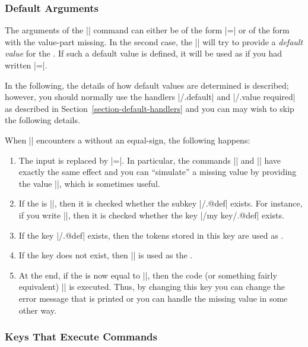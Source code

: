 \subsubsection{Default Arguments}

The arguments of the |\pgfkeys| command can either be of the form
|=| or of the form  with the
value-part missing. In the second case, the |\pgfkeys| will try to
provide a \emph{default value} for the . If such a default
value is defined, it will be used as if you had written
|=|.

In the following, the details of how default values are determined is
described; however, you should normally use the handlers |/.default|
and |/.value required| as described in
Section~\ref{section-default-handlers} and you can may wish to skip
the following details.

When |\pgfkeys| encounters a  without an equal-sign, the
following happens:
\begin{enumerate}
\item The input is replaced by |=\pgfkeysnovalue|. In
  particular, the commands || and
  || have exactly the same effect and
  you can ``simulate'' a missing value by providing the value
  |\pgfkeysnovalue|, which is sometimes useful. 
\item If the  is |\pgfkeysnovalue|, then it is checked
  whether the subkey |/.@def| exists. For instance, if you
  write ||, then it is checked whether the key
  |/my key/.@def| exists.
\item If the key |/.@def| exists, then the tokens stored in
  this key are used as .
\item If the key does not exist, then |\pgfkeysnovalue| is used as the
  .
\item At the end, if the  is now equal to
  |\pgfkeysvaluerequired|, then the code  (or something fairly equivalent)
  ||
  is executed. Thus, by changing this key you can change the error
  message that is printed or you can handle the missing value in some
  other way.
\end{enumerate}



\subsubsection{Keys That Execute Commands}
\label{section-key-code}

